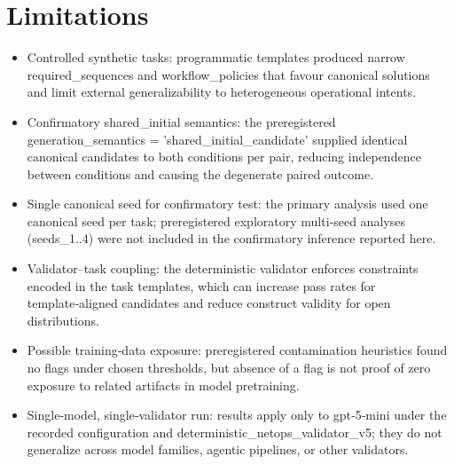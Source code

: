 \documentclass[conference]{IEEEtran}
\begin{document}
\section{Limitations}
\begin{itemize}
\item Controlled synthetic tasks: programmatic templates produced narrow required\_sequences and workflow\_policies that favour canonical solutions and limit external generalizability to heterogeneous operational intents.
\item Confirmatory shared\_initial semantics: the preregistered generation\_semantics = 'shared\_initial\_candidate' supplied identical canonical candidates to both conditions per pair, reducing independence between conditions and causing the degenerate paired outcome.
\item Single canonical seed for confirmatory test: the primary analysis used one canonical seed per task; preregistered exploratory multi‑seed analyses (seeds\_1..4) were not included in the confirmatory inference reported here.
\item Validator--task coupling: the deterministic validator enforces constraints encoded in the task templates, which can increase pass rates for template‑aligned candidates and reduce construct validity for open distributions.
\item Possible training‑data exposure: preregistered contamination heuristics found no flags under chosen thresholds, but absence of a flag is not proof of zero exposure to related artifacts in model pretraining.
\item Single‑model, single‑validator run: results apply only to gpt‑5‑mini under the recorded configuration and deterministic\_netops\_validator\_v5; they do not generalize across model families, agentic pipelines, or other validators.
\end{itemize}
\end{document}
